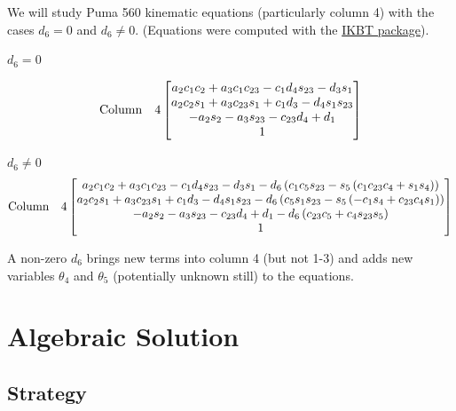 \begin{Example}
    We will study Puma 560 kinematic equations (particularly column 4) 
with the cases $d_6=0 $ and $d_6 \neq 0$.  (Equations were computed with the 
\href{https://github.com/uw-biorobotics/IKBT}{IKBT package}).

\vspace{0.3in}

$d_6 = 0$

\[
\mathrm{Column \quad4}\\
\left[\begin{matrix}a_{2} c_{1} c_{2} + a_{3} c_{1} c_{23} - c_{1} d_{4} s_{23} - d_{3} s_{1}\\
    a_{2} c_{2} s_{1} + a_{3} c_{23} s_{1} + c_{1} d_{3} - d_{4} s_{1} s_{23}\\
    - a_{2} s_{2} - a_{3} s_{23} - c_{23} d_{4} + d_{1}\\
    1\end{matrix}
\right]
\]

$d_6 \neq 0$
\[
\mathrm{Column \quad4}\\\left[\begin{matrix}a_{2} c_{1} c_{2} + a_{3} c_{1} c_{23} - c_{1} d_{4} s_{23} - d_{3} s_{1} - d_{6} \left(c_{1} c_{5} s_{23} - s_{5} \left(c_{1} c_{23} c_{4} + s_{1} s_{4}\right)\right)\\
    a_{2} c_{2} s_{1} + a_{3} c_{23} s_{1} + c_{1} d_{3} - d_{4} s_{1} s_{23} - d_{6} \left(c_{5} s_{1} s_{23} - s_{5} \left(- c_{1} s_{4} + c_{23} c_{4} s_{1}\right)\right)\\
    - a_{2} s_{2} - a_{3} s_{23} - c_{23} d_{4} + d_{1} - d_{6} \left(c_{23} c_{5} + c_{4} s_{23} s_{5}\right)\\
    1 \end{matrix}
\right]
\]

A non-zero $d_6$ brings new terms into column 4  (but not 1-3) and adds new variables $\theta_4$ 
and $\theta_5$ (potentially unknown
still) to the equations. 
\end{Example}


\section{Algebraic Solution}

\subsection{Strategy}

